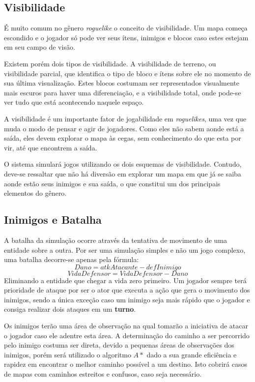 \subsection{Visibilidade}

É muito comum no gênero \textit{roguelike} o conceito de visibilidade. Um mapa começa escondido e o jogador só pode ver seus ítens, inimigos e blocos caso estes estejam em seu campo de visão. 

Existem porém dois tipos de visibilidade. A visibilidade de terreno, ou visibilidade parcial, que identifica o tipo de bloco e ítens sobre ele no momento de sua última visualização. Estes blocos costumam ser representados visualmente mais escuros para haver uma diferenciação, e a visibilidade total, onde pode-se ver tudo que está acontecendo naquele espaço. 

A visibilidade é um importante fator de jogabilidade em \textit{roguelikes}, uma vez que muda o modo de pensar e agir de jogadores. Como eles não sabem aonde está a saída, eles devem explorar o mapa às cegas, sem conhecimento do que esta por vir, até que encontrem a saída. 

O sistema simulará jogos utilizando os dois esquemas de visibilidade. Contudo, deve-se ressaltar que não há diversão em explorar um mapa em que já se saiba aonde estão seus inimigos e sua saída, o que constitui um dos principais elementos do gênero.

\subsection{Inimigos e Batalha}

A batalha da simulação ocorre através da tentativa de movimento de uma entidade sobre a outra.
Por ser uma simulação simples e não um jogo complexo, uma batalha decorre-se apenas pela fórmula: 
\begin{equation}
	Dano = atkAtacante - defInimigo
\end{equation}
\begin{equation}
	VidaDefensor = VidaDefensor - Dano
\end{equation}
Eliminando a entidade que chegar a vida zero primeiro. Um jogador sempre terá prioridade de ataque por ser o ator que executa a ação que gera o movimento dos inimigos, sendo a única exceção caso um inimigo seja mais rápido que o jogador e consiga realizar dois ataques em um \textbf{turno}.

Os inimigos terão uma área de observação na qual tomarão a iniciativa de atacar o jogador caso ele adentre esta área. 
A determinação do caminho a ser percorrido pelo inimigo costuma ser direta, devido a pequenas áreas de observações dos inimigos, porém será utilizado o algoritmo $A*$ dado a sua grande eficiência e rapidez em encontrar o melhor caminho possível a um destino. Isto cobrirá casos de mapas com caminhos estreitos e confusos, caso seja necessário. 


